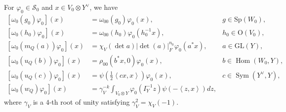 \documentclass[article]{article}
\numberwithin{equation}{section}
\theoremstyle{definition}
\begin{document}
For $\varphi_0 \in \mathscr{S}_0$ and $x\in V_0\otimes Y^\vee$, we have 
\begin{align*}
\left[\omega_0(g_0) \varphi_0\right]\left(x\right) & =\omega_{00}(g_0)\varphi_0(x), & g \in \mathrm{Sp}(W_0), \\
\left[\omega_0(h_0) \varphi_0\right](x) & =\omega_{00}(h_0)\varphi_0(h_{0}^{-1}x),  &  h_0 \in  \mathrm{O}(V_0), \\
\left[\omega_0\left( m_{Q}(a)\right) \varphi_0\right]\left(x\right) & =\chi_{V}(\det a)|\operatorname{det}(a)|_{F}^{n_0} \varphi_0(a^{*} x), & {a \in \mathrm{GL}(Y)} ,\\ 
\left[\omega_0\left( u_{Q}(b)\right) \varphi_0\right]\left(x\right) & =\rho_{00}\left(b^{*} x, 0\right)\varphi_0(x) , & {b \in \operatorname{Hom}(W_0, Y)},\\
\left[\omega_0\left( u_{Q}(c)\right) \varphi_0\right]\left(x\right) &=\psi\left(\frac{1}{2}\left\langle c x, x\right\rangle\right) \varphi_0\left(x\right),  & c \in \operatorname{Sym}\left(Y^\vee, Y\right) ,\\
\left[\omega_0\left(w_{Q}\right) \varphi_0\right]\left(x\right) &=\gamma_{V}^{-k} \int_{V_0 \otimes Y} \varphi_0\left(I_{Y}^{-1} z\right) \psi\left(-\left\langle z, x\right\rangle\right) d z, \end{align*}
where $\gamma_{V}$ is a $4$-th root of unity satisfying $\gamma_{V}^{2}=\chi_{V}(-1)$.
\end{document}
